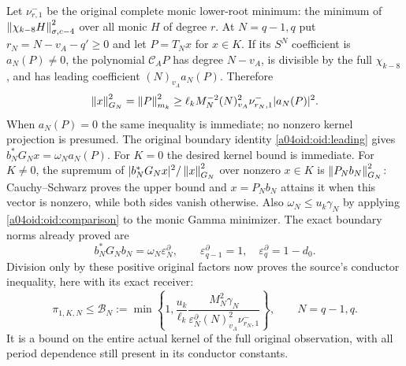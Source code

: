 Let $\nu^-_{r,1}$ be the original complete monic lower-root minimum:
the minimum of
$\left\lVert\chi_{k-8}H\right\rVert_{\sigma,c-4}^2$ over all monic $H$ of degree
$r$. At $N=q-1,q$ put $r_N=N-v_A-q'\ge0$ and let
$P=T_Nx$ for $x\in K$. If its $S^N$ coefficient is $a_N(P)\ne0$,
the polynomial $\mathcal C_AP$ has degree $N-v_A$, is divisible
by the full $\chi_{k-8}$, and has leading coefficient
$(N)_{v_A}a_N(P)$. Therefore
\begin{equation}\label{a04oid:oid:kernelcoefficient}
 \left\lVert x\right\rVert_{G_N}^2=\left\lVert P\right\rVert_{m_k}^2
 \ge\ell_k M_N^{-2}(N)_{v_A}^2
 \nu^-_{r_N,1}|a_N(P)|^2.
\end{equation}
When $a_N(P)=0$ the same inequality is immediate; no nonzero kernel
projection is presumed. The original boundary identity
\eqref{a04oid:oid:leading} gives
$b_N^*G_Nx=\omega_Na_N(P)$.
For $K=0$ the desired kernel bound is immediate. For $K\ne0$, the
supremum of $|b_N^*G_Nx|^2/\left\lVert x\right\rVert_{G_N}^2$ over nonzero
$x\in K$ is $\left\lVert P_Nb_N\right\rVert_{G_N}^2$: Cauchy--Schwarz proves
the upper bound and $x=P_Nb_N$ attains it when this vector is
nonzero, while both sides vanish otherwise.
Also $\omega_N\le u_k\gamma_N$ by applying
\eqref{a04oid:oid:comparison} to the monic Gamma minimizer.
The exact boundary norms already proved are
\[
 b_N^*G_Nb_N=\omega_N\varepsilon_N^\partial,
 \qquad\varepsilon_{q-1}^\partial=1,\quad
 \varepsilon_q^\partial=1-d_0.
\]
Division only by these positive original factors now proves the
source's conductor inequality, here with its exact receiver:
\begin{equation}\label{a04oid:oid:finitepi}
 \boxed{\pi_{1,K,N}\le\mathcal B_N:=
 \min\left\{1,\frac{u_k}{\ell_k}
 \frac{M_N^2\gamma_N}
 {\varepsilon_N^\partial(N)_{v_A}^2\nu^-_{r_N,1}}\right\},
 \qquad N=q-1,q.}
\end{equation}
It is a bound on the entire actual kernel of the full original
observation, with all period dependence still present in its
conductor constants.


